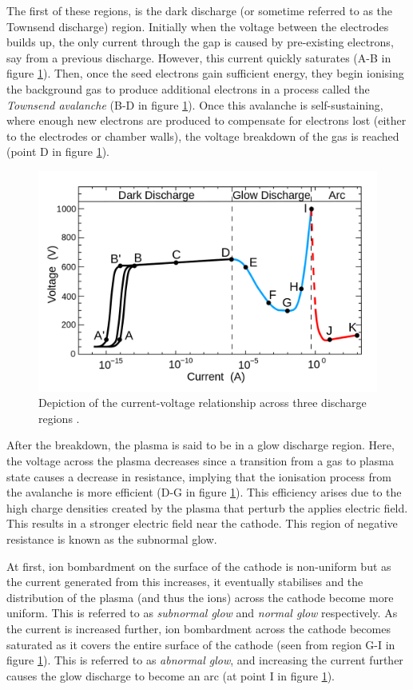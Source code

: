 The first of these regions, is the dark discharge (or sometime referred to as the Townsend discharge) region. Initially when the voltage between the electrodes builds up, the only current through the gap is caused by pre-existing electrons, say from a previous discharge. However, this current quickly saturates (A-B in figure \ref{fig:dc_discharge}). Then, once the seed electrons gain sufficient energy, they begin ionising the background gas to produce additional electrons in a process called the \textit{Townsend avalanche} (B-D in figure \ref{fig:dc_discharge}). Once this avalanche is self-sustaining, where enough new electrons are produced to compensate for electrons lost (either to the electrodes or chamber walls), the voltage breakdown of the gas is reached (point D in figure \ref{fig:dc_discharge}).

\begin{figure}[h!]
	\centering
	\includegraphics[width=0.8\linewidth]{chapter_2/figures/dc_discharge.png}
	\caption{Depiction of the current-voltage relationship across three discharge regions \cite{Gallo1975}.}
	\label{fig:dc_discharge}
\end{figure}

After the breakdown, the plasma is said to be in a glow discharge region. Here, the voltage across the plasma decreases since a transition from a gas to plasma state causes a decrease in resistance, implying that the ionisation process from the avalanche is more efficient (D-G in figure \ref{fig:dc_discharge}). This efficiency arises due to the high charge densities created by the plasma that perturb the applies electric field. This results in a stronger electric field near the cathode. This region of negative resistance is known as the subnormal glow. 

At first, ion bombardment on the surface of the cathode is non-uniform but as the current generated from this increases, it eventually stabilises and the distribution of the plasma (and thus the ions) across the cathode become more uniform. This is referred to as \textit{subnormal glow} and \textit{normal glow} respectively. As the current is increased further, ion bombardment across the cathode becomes saturated as it covers the entire surface of the cathode (seen from region G-I in figure \ref{fig:dc_discharge}). This is referred to as \textit{abnormal glow}, and increasing the current further causes the glow discharge to become an arc (at point I in figure \ref{fig:dc_discharge}).

